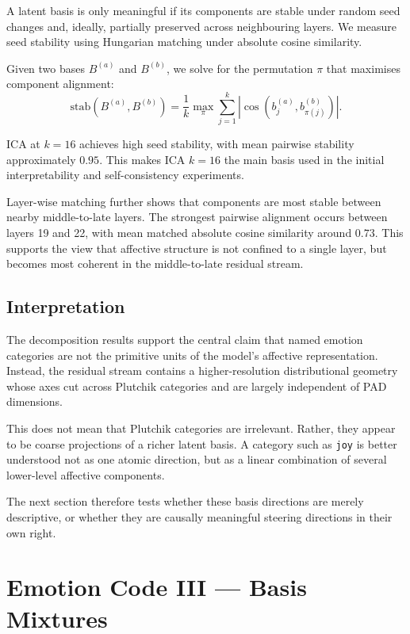 \documentclass[12pt,twoside]{report}
\begin{document}
A latent basis is only meaningful if its components are stable under random seed changes and, ideally, partially preserved across neighbouring layers. We measure seed stability using Hungarian matching under absolute cosine similarity.

Given two bases $B^{(a)}$ and $B^{(b)}$, we solve for the  permutation $\pi$ that maximises component alignment:
\begin{equation}
\mathrm{stab}
\left(
B^{(a)}, B^{(b)}
\right)
=
\frac{1}{k}
\max_{\pi}
\sum_{j=1}^{k}
\left|
\cos
\left(
b_j^{(a)},
b_{\pi(j)}^{(b)}
\right)
\right|.
\end{equation}

ICA at $k=16$ achieves high seed stability, with mean pairwise stability approximately $0.95$. This makes ICA $k=16$ the main basis used in the initial interpretability and self-consistency experiments.

Layer-wise matching further shows that components are most stable between nearby middle-to-late layers. The strongest pairwise alignment occurs between layers 19 and 22, with mean matched absolute cosine similarity around $0.73$. This supports the view that affective structure is not confined to a single layer, but becomes most coherent in the middle-to-late residual stream.

\subsection{Interpretation}
\label{sec:emotion_code:basis:interpretation}

The decomposition results support the central claim that named emotion categories are not the primitive units of the model's affective representation. Instead, the residual stream contains a higher-resolution distributional geometry whose axes cut across Plutchik categories and are largely independent of PAD dimensions.

This does not mean that Plutchik categories are irrelevant. Rather, they appear to be coarse projections of a richer latent basis. A category such as \texttt{joy} is better understood not as one atomic direction, but as a linear combination of several lower-level affective components.

The next section therefore tests whether these basis directions are merely descriptive, or whether they are causally meaningful steering directions in their own right.


\section{Emotion Code III --- Basis Mixtures}
\label{sec:emotion_code:caa_basis_decomposition}
\end{document}
